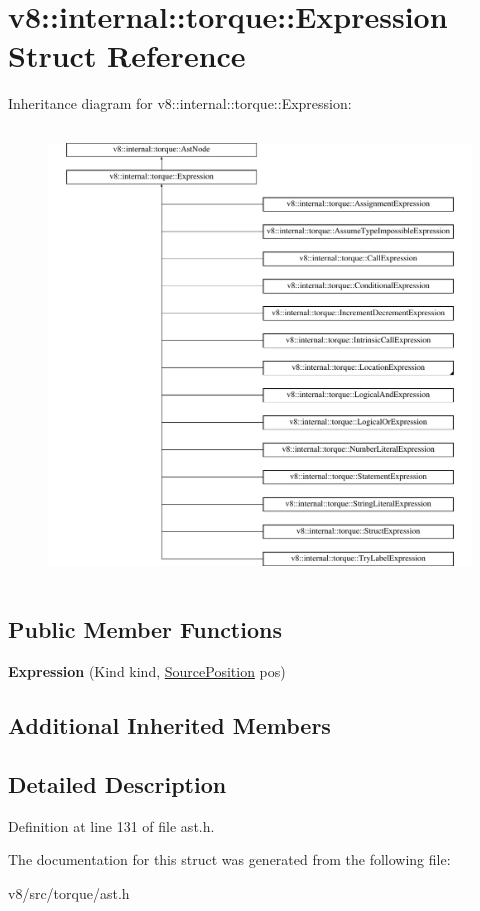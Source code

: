 \hypertarget{structv8_1_1internal_1_1torque_1_1Expression}{}\section{v8\+:\+:internal\+:\+:torque\+:\+:Expression Struct Reference}
\label{structv8_1_1internal_1_1torque_1_1Expression}
Inheritance diagram for v8\+:\+:internal\+:\+:torque\+:\+:Expression\+:\begin{figure}[H]
\begin{center}
\leavevmode
\includegraphics[height=12.000000cm]{structv8_1_1internal_1_1torque_1_1Expression}
\end{center}
\end{figure}
\subsection*{Public Member Functions}
\begin{DoxyCompactItemize}
\item 
\mbox{\label{structv8_1_1internal_1_1torque_1_1Expression_a507fbc269292e1f8eaa093d34d03a296}} 
{\bfseries Expression} (Kind kind, \mbox{\hyperlink{structv8_1_1internal_1_1torque_1_1SourcePosition}{Source\+Position}} pos)
\end{DoxyCompactItemize}
\subsection*{Additional Inherited Members}


\subsection{Detailed Description}


Definition at line 131 of file ast.\+h.



The documentation for this struct was generated from the following file\+:\begin{DoxyCompactItemize}
\item 
v8/src/torque/ast.\+h\end{DoxyCompactItemize}

